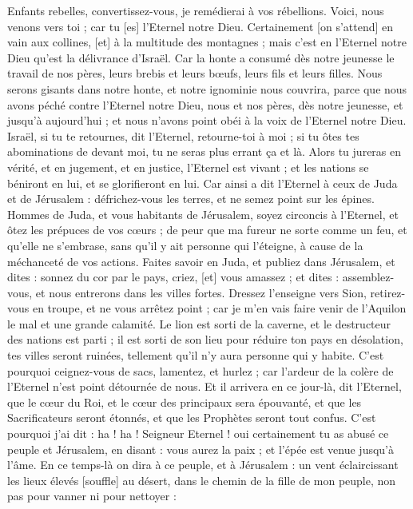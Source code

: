 \begin{multicols}{2}
Enfants rebelles, convertissez-vous, je remédierai à vos rébellions. Voici, nous venons vers toi ; car tu [es] l'Eternel notre Dieu.
Certainement [on s'attend] en vain aux collines, [et] à la multitude des montagnes ; mais c'est en l'Eternel notre Dieu qu'est la délivrance d'Israël.
Car la honte a consumé dès notre jeunesse le travail de nos pères, leurs brebis et leurs bœufs, leurs fils et leurs filles.
Nous serons gisants dans notre honte, et notre ignominie nous couvrira, parce que nous avons péché contre l'Eternel notre Dieu, nous et nos pères, dès notre jeunesse, et jusqu’à aujourd'hui ; et nous n'avons point obéi à la voix de l'Eternel notre Dieu.
\VerseOne{}Israël, si tu te retournes, dit l'Eternel, retourne-toi à moi ; si tu ôtes tes abominations de devant moi, tu ne seras plus errant ça et là.
Alors tu jureras en vérité, et en jugement, et en justice, l'Eternel est vivant ; et les nations se béniront en lui, et se glorifieront en lui.
Car ainsi a dit l'Eternel à ceux de Juda et de Jérusalem : défrichez-vous les terres, et ne semez point sur les épines.
Hommes de Juda, et vous habitants de Jérusalem, soyez circoncis à l'Eternel, et ôtez les prépuces de vos cœurs ; de peur que ma fureur ne sorte comme un feu, et qu'elle ne s'embrase, sans qu'il y ait personne qui l'éteigne, à cause de la méchanceté de vos actions.
Faites savoir en Juda, et publiez dans Jérusalem, et dites : sonnez du cor par le pays, criez, [et] vous amassez ; et dites : assemblez-vous, et nous entrerons dans les villes fortes.
Dressez l'enseigne vers Sion, retirez-vous en troupe, et ne vous arrêtez point ; car je m'en vais faire venir de l'Aquilon le mal et une grande calamité.
Le lion est sorti de la caverne, et le destructeur des nations est parti ; il est sorti de son lieu pour réduire ton pays en désolation, tes villes seront ruinées, tellement qu'il n'y aura personne qui y habite.
C'est pourquoi ceignez-vous de sacs, lamentez, et hurlez ; car l'ardeur de la colère de l'Eternel n'est point détournée de nous.
Et il arrivera en ce jour-là, dit l'Eternel, que le cœur du Roi, et le cœur des principaux sera épouvanté, et que les Sacrificateurs seront étonnés, et que les Prophètes seront tout confus.
C'est pourquoi j'ai dit : ha ! ha ! Seigneur Eternel ! oui certainement tu as abusé ce peuple et Jérusalem, en disant : vous aurez la paix ; et l'épée est venue jusqu’à l'âme.
En ce temps-là on dira à ce peuple, et à Jérusalem : un vent éclaircissant les lieux élevés [souffle] au désert, dans le chemin de la fille de mon peuple, non pas pour vanner ni pour nettoyer :

\end{multicols}
